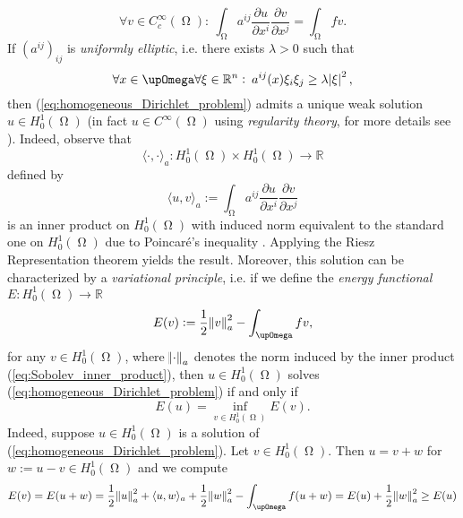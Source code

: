 \begin{equation*}
	\forall v \in C^\infty_c(\upOmega): \> \int_\upOmega a^{ij} \frac{\partial u}{\partial x^i}\frac{\partial v}{\partial x^j} = \int_\upOmega fv.
\end{equation*}
If $(a^{ij})_{ij}$ is \emph{uniformly elliptic}, i.e. there exists $\lambda > 0$ such that
\begin{equation*}
	\forall x \in \upOmega\forall \xi \in \mathbb{R}^n : \> a^{ij}(x)\xi_i\xi_j \geq \lambda \abs{\xi}^2,	
\end{equation*}
\noindent then (\ref{eq:homogeneous_Dirichlet_problem}) admits a unique weak solution $u \in H^1_0(\upOmega)$ (in fact $u \in C^\infty(\upOmega)$ using \emph{regularity theory}, for more details see \cite[175]{struwe:fa:2014}). Indeed, observe that 
\begin{equation*}
	\langle \cdot,\cdot \rangle_a : H^1_0(\upOmega) \times H^1_0(\upOmega) \to \mathbb{R}
\end{equation*}
\noindent defined by
\begin{equation}
	\label{eq:Sobolev_inner_product}
	\langle u, v \rangle_a := \int_\upOmega a^{ij} \frac{\partial u}{\partial x^i}\frac{\partial v}{\partial x^j}
\end{equation}
\noindent is an inner product on $H^1_0(\upOmega)$ with induced norm equivalent to the standard one on $H^1_0(\upOmega)$ due to Poincar\'e's inequality \cite[107]{struwe:fa:2014}. Applying the Riesz Representation theorem \cite[49--50]{struwe:fa:2014} yields the result. Moreover, this solution can be characterized by a \emph{variational principle}, i.e. if we define the \emph{energy functional} $E : H^1_0(\upOmega) \to \mathbb{R}$
\begin{equation*}
	E(v) := \frac{1}{2} \norm{v}^2_a - \int_\upOmega fv,
\end{equation*}
\noindent for any $v \in H^1_0(\upOmega)$, where $\norm{\cdot}_a$ denotes the norm induced by the inner product (\ref{eq:Sobolev_inner_product}), then $u \in H^1_0(\upOmega)$ solves (\ref{eq:homogeneous_Dirichlet_problem}) if and only if
\begin{equation}
	\label{eq:variational_formulation}
	E(u) = \inf_{v \in H^1_0(\upOmega)}E(v).
\end{equation}
Indeed, suppose $u \in H^1_0(\upOmega)$ is a solution of (\ref{eq:homogeneous_Dirichlet_problem}). Let $v \in H^1_0(\upOmega)$. Then $u = v + w$ for $w := u - v \in H^1_0(\upOmega)$ and we compute
\begin{equation*}
	E(v) = E(u + w) = \frac{1}{2}\norm{u}^2_a + \langle u,w \rangle_a + \frac{1}{2}\norm{w}^2_a - \int_\upOmega f(u + w) = E(u) + \frac{1}{2}\norm{w}^2_a \geq E(u)
\end{equation*}
